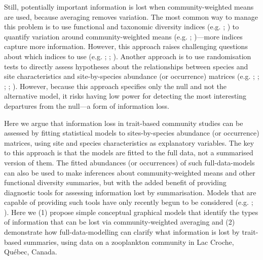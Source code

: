 \documentclass[12pt]{ecology}
\begin{document}
Still, potentially important information is lost when community-weighted means are used, because averaging removes variation.  The most common way to manage this problem is to use functional and taxonomic diversity indices (e.g. ; ) to quantify variation around community-weighted means (e.g. ; )---more indices capture more information.  However, this approach raises challenging questions about which indices to use (e.g. ; ; ).  Another approach is to use randomisation tests to directly assess hypotheses about the relationships between species and site characteristics and site-by-species abundance (or occurrence) matrices (e.g. ; ; ; ; ).  However, because this approach specifies only the null and not the alternative model, it risks having low power for detecting the most interesting departures from the null---a form of information loss.

Here we argue that information loss in trait-based community studies can be assessed by fitting statistical models to sites-by-species abundance (or occurrence) matrices, using site and species characteristics as explanatory variables.  The key to this approach is that the models are fitted to the full data, not a summarised version of them.  The fitted abundances (or occurrences) of such full-data-models can also be used to make inferences about community-weighted means and other functional diversity summaries, but with the added benefit of providing diagnostic tools for assessing information lost by summarisation.  Models that are capable of providing such tools have only recently begun to be considered (e.g. ; ).  Here we (1) propose simple conceptual  graphical models that identify the types of information that can be lost via community-weighted averaging and (2) demonstrate how full-data-modelling can clarify what information is lost by trait-based summaries, using data on a zooplankton community in Lac Croche, Qu\'{e}bec, Canada.

\end{document}
